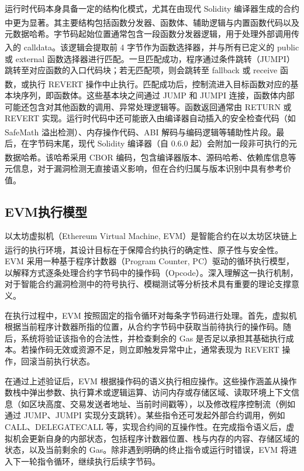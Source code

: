 \documentclass[print, master, vlined, timesmath]{DissertUESTC}
\begin{document}
运行时代码本身具备一定的结构化模式，尤其在由现代 Solidity 编译器生成的合约中更为显著\textsuperscript{\cite{...}}。其主要结构包括函数分发器、函数体、辅助逻辑与内置函数代码以及元数据哈希。字节码起始位置通常包含一段函数分发器逻辑，用于处理外部调用传入的 calldata。该逻辑会提取前 4 字节作为函数选择器\textsuperscript{\cite{...}}，并与所有已定义的 public 或 external 函数选择器进行匹配。一旦匹配成功，程序通过条件跳转（JUMPI）跳转至对应函数的入口代码块；若无匹配项，则会跳转至 fallback 或 receive 函数\textsuperscript{\cite{...}}，或执行 REVERT 操作中止执行。匹配成功后，控制流进入目标函数对应的基本块序列，即函数体。这些基本块之间通过 JUMP 和 JUMPI 连接，函数体内部可能还包含对其他函数的调用、异常处理逻辑等。函数返回通常由 RETURN 或 REVERT 实现。运行时代码中还可能嵌入由编译器自动插入的安全检查代码（如 SafeMath 溢出检测\textsuperscript{\cite{...}}）、内存操作代码、ABI 解码与编码逻辑等辅助性片段。最后，在字节码末尾，现代 Solidity 编译器（自 0.6.0 起）会附加一段非可执行的元数据哈希\textsuperscript{\cite{...}}。该哈希采用 CBOR 编码\textsuperscript{\cite{...}}，包含编译器版本、源码哈希、依赖库信息等元信息，对于漏洞检测无直接语义影响，但在合约归属与版本识别中具有参考价值。

\subsection{EVM执行模型}

以太坊虚拟机（Ethereum Virtual Machine, EVM）是智能合约在以太坊区块链上运行的执行环境，其设计目标在于保障合约执行的确定性、原子性与安全性\textsuperscript{\cite{...}}。EVM 采用一种基于程序计数器（Program Counter, PC）驱动的循环执行模型，以解释方式逐条处理合约字节码中的操作码（Opcode）。深入理解这一执行机制，对于智能合约漏洞检测中的符号执行、模糊测试等分析技术具有重要的理论支撑意义。

在执行过程中，EVM 按照固定的指令循环对每条字节码进行处理。首先，虚拟机根据当前程序计数器所指的位置，从合约字节码中获取当前待执行的操作码。随后，系统将验证该指令的合法性，并检查剩余的 Gas 是否足以承担其基础执行成本。若操作码无效或资源不足，则立即触发异常中止，通常表现为 REVERT 操作，回滚当前执行状态。

在通过上述验证后，EVM 根据操作码的语义执行相应操作。这些操作涵盖从操作数栈中弹出参数、执行算术或逻辑运算、访问内存或存储区域、读取环境上下文信息（如区块高度、交易发送者地址、当前时间戳等），以及修改程序控制流（例如通过 JUMP、JUMPI 实现分支跳转）。某些指令还可发起外部合约调用，例如 CALL、DELEGATECALL 等，实现合约间的互操作性。在完成指令语义后，虚拟机会更新自身的内部状态，包括程序计数器位置、栈与内存的内容、存储区域的状态，以及当前剩余的 Gas。除非遇到明确的终止指令或运行时错误，EVM 将进入下一轮指令循环，继续执行后续字节码。
\end{document}
